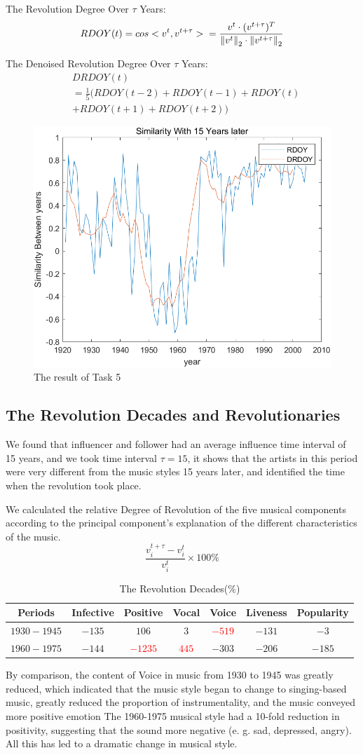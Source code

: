 \documentclass[conference]{IEEEtran}
\begin{document}
The Revolution Degree Over $\tau$ Years:
\[
RDOY(t)=cos<v^{t},v^{t+\tau}> \\
=\frac{v^{t} \cdot (v^{t+\tau})^{T}}{{\|v^{t}\|}_2 \cdot {\|v^{t+\tau}\|}_2}
\]

The Denoised Revolution Degree Over $\tau$ Years:
$$
\begin{aligned}
& 	DRDOY(t)\\ 
& 	=\frac{1}{5}(RDOY({t-2})+RDOY({t-1})+RDOY({t})\\
& 	+RDOY({t+1})+RDOY({t+2}))
\end{aligned}
$$
\begin{figure}[!htbp]
	\centering
	\includegraphics[width=.3\textwidth]{./img/revolution}
	\caption{The result of Task 5}\label{fig:revolution}
\end{figure}


\subsection{The Revolution Decades and Revolutionaries}
We found that influencer and follower had an average influence time interval of 15 years, and we took time interval $\tau = 15$, it shows that the artists in this period were very different from the music styles 15 years later, and identified the time when the revolution took place.

We calculated the relative Degree of Revolution of the five musical components according to the principal component’s explanation of the different characteristics of the music.
\[\frac{v_{i}^{t+\tau}-v_{i}^{t}}{v_{i}^{t}} \times 100\%\]
\begin{table}[!htbp]
	\centering
	\caption{The Revolution Decades($\%$)}
	\begin{tabular}{c|cccccc}
		\hline
		Periods& Infective& Positive & Vocal & Voice &Liveness & Popularity \\
		\hline
		$1930-1945$ & $-135$  & $106$   & $3$     & \textcolor{red}{$-519 $} & $-131$  & $-3$ \\
		$1960-1975$ & $-144 $ & \textcolor{red}{$-1235$} & \textcolor{red}{$445$}   & $-303$  & $-206$  & $-185$ \\
		\hline
	\end{tabular}%
	\label{tb:The Revolution Decades}%
\end{table}%
By comparison, the content of Voice in music from 1930 to 1945 was greatly reduced, which indicated that the music style began to change to singing-based music, greatly reduced the proportion of instrumentality, and the music conveyed more positive emotion
The 1960-1975 musical style had a 10-fold reduction in positivity, suggesting that the sound more negative (e. g. sad, depressed, angry). All this has led to a dramatic change in musical style.
\end{document}
